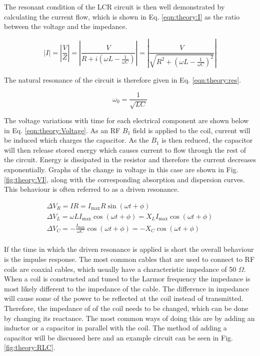 The resonant condition of the LCR circuit is then well demonstrated by calculating the current flow, which is shown in Eq. \ref{eqn:theory:I} as the ratio between the voltage and the impedance.

\begin{equation}
    |I| = \left| \frac{V}{Z} \right| = \left| \frac{V}{R+i(\omega L - \frac{1}{\omega C})} \right| = \left| \frac{V}{\sqrt{R^2+(\omega L - \frac{1}{\omega C})^2}} \right|
    \label{eqn:theory:I}
\end{equation}

The natural resonance of the circuit is therefore given in Eq. \ref{eqn:theory:res}.

\begin{equation}
    \omega_0 = \frac{1}{\sqrt{LC}}
    \label{eqn:theory:res}
\end{equation}

The voltage variations with time for each electrical component are shown below in Eq. \ref{eqn:theory:Voltage}. As an \ac{RF} $B_1$ field is applied to the coil, current will be induced which charges the capacitor. As the $B_1$ is then reduced, the capacitor will then release stored energy which causes current to flow through the rest of the circuit. Energy is dissipated in the resistor and therefore the current decreases exponentially. Graphs of the change in voltage in this case are shown in Fig. \ref{fig:theory:VI}, along with the corresponding absorption and dispersion curves. This behaviour is often referred to as a driven resonance.

\begin{equation}
\begin{gathered}
    \Delta V_R = IR = I_{\mathrm{max}}R\sin(\omega t + \phi) \\
    \Delta V_L = \omega LI_{\mathrm{max}}\cos(\omega t + \phi) =  X_LI_{\mathrm{max}}\cos(\omega t + \phi)\\
    \Delta V_C = -\frac{I_{\mathrm{max}}}{\omega C}\cos(\omega t + \phi) = -X_C\cos(\omega t + \phi)\\
    \label{eqn:theory:Voltage}
\end{gathered}
\end{equation}

If the time in which the driven resonance is applied is short the overall behaviour is the impulse response. The most common cables that are used to connect to \ac{RF} coils are coaxial cables, which usually have a characteristic impedance of 50 $\Omega$. When a coil is constructed and tuned to the Larmor frequency the impedance is most likely different to the impedance of the cable. The difference in impedance will cause some of the power to be reflected at the coil instead of transmitted. Therefore, the impedance of of the coil needs to be changed, which can be done by changing its reactance. The most common ways of doing this are by adding an inductor or a capacitor in parallel with the coil. The method of adding a capacitor will be discussed here and an example circuit can be seen in Fig. \ref{fig:theory:RLC}.

